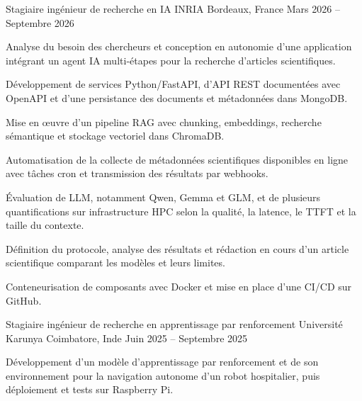 
\begin{cventries}
  \cventry
    {Stagiaire ingénieur de recherche en IA}
    {INRIA}
    {Bordeaux, France}
    {Mars 2026 -- Septembre 2026}
    {
      \begin{cvitems}
        \item {Analyse du besoin des chercheurs et conception en autonomie d’une application intégrant un agent IA multi-étapes pour la recherche d’articles scientifiques.}
        \item {Développement de services Python/FastAPI, d’API REST documentées avec OpenAPI et d’une persistance des documents et métadonnées dans MongoDB.}
        \item {Mise en œuvre d’un pipeline RAG avec chunking, embeddings, recherche sémantique et stockage vectoriel dans ChromaDB.}
        \item {Automatisation de la collecte de métadonnées scientifiques disponibles en ligne avec tâches cron et transmission des résultats par webhooks.}
        \item {Évaluation de LLM, notamment Qwen, Gemma et GLM, et de plusieurs quantifications sur infrastructure HPC selon la qualité, la latence, le TTFT et la taille du contexte.}
        \item {Définition du protocole, analyse des résultats et rédaction en cours d’un article scientifique comparant les modèles et leurs limites.}
        \item {Conteneurisation de composants avec Docker et mise en place d’une CI/CD sur GitHub.}
      \end{cvitems}
    }

  \cventry
    {Stagiaire ingénieur de recherche en apprentissage par renforcement}
    {Université Karunya}
    {Coimbatore, Inde}
    {Juin 2025 -- Septembre 2025}
    {
      \begin{cvitems}
        \item {Développement d’un modèle d’apprentissage par renforcement et de son environnement pour la navigation autonome d’un robot hospitalier, puis déploiement et tests sur Raspberry Pi.}
      \end{cvitems}
    }
\end{cventries}
